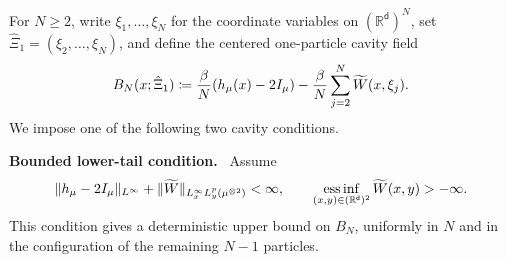 \documentclass[11pt,reqno]{amsart}
\numberwithin{equation}{section}
\theoremstyle{plain}
\theoremstyle{remark}
\DeclarePairedDelimiter{\pa}{\lparen}{\rparen}
\DeclarePairedDelimiter{\norm}{\lVert}{\rVert}
\renewcommand{\d}{\mathsf{d}}
\newcommand{\R}{{\mathbb{R}}}
\newcommand{\tl}{\widetilde}
\newcommand{\be}{\beta}
\newcommand{\parheading}[1]{\par\medskip\noindent\textbf{#1}\ }
\begin{document}
For \(N\ge2\), write \(\xi_1,\ldots,\xi_N\) for the coordinate variables on \((\R^\d)^N\), set \(\hat\Xi_1=(\xi_2,\ldots,\xi_N)\), and define the centered one-particle cavity field
\begin{align}\label{eq:cavity-B-def}
 B_N(x;\hat\Xi_1)
 \coloneqq \frac{\be}{N}\pa{h_\mu(x)-2I_\mu}
 -\frac{\be}{N}\sum_{j=2}^N \tl W(x,\xi_j).
\end{align}
We impose one of the following two cavity conditions.

\parheading{Bounded lower-tail condition.}
Assume
\begin{align}\label{eq:cavity-tail-bounded}
 \norm{h_\mu-2I_\mu}_{L^\infty}
 +\norm{\tl W}_{L_x^\infty L_y^p(\mu^{\otimes2})}<\infty,
 \qquad
 \operatorname*{ess\,inf}_{(x,y)\in(\R^\d)^2}\tl W(x,y)>-\infty.
\end{align}
This condition gives a deterministic upper bound on \(B_N\), uniformly in \(N\) and in the configuration of the remaining \(N-1\) particles.
\end{document}
